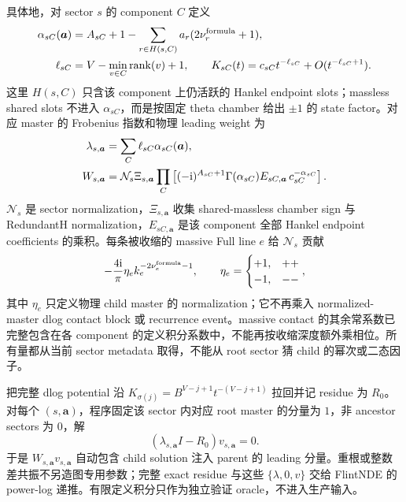\documentclass[11pt,a4paper]{ctexart}
\newcommand{\ii}{\mathrm i}
\newcommand{\cN}{\mathcal N}
\begin{document}
具体地，对 sector $s$ 的 component $C$ 定义
\begin{align}
 \alpha_{sC}(\bm a)&=A_{sC}+1-
 \sum_{r\in H(s,C)}a_r(2\nu_r^{\rm formula}+1),
 \notag\\
 \ell_{sC}&=V-\min_{v\in C}\operatorname{rank}(v)+1,
 \qquad
 K_{sC}(t)=c_{sC}t^{-\ell_{sC}}+O(t^{-\ell_{sC}+1}).
 \label{eq:generic-sector-boundary-component}
\end{align}
这里 $H(s,C)$ 只含该 component 上仍活跃的 Hankel endpoint slots；massless shared slots 不进入 $\alpha_{sC}$，而是按固定 theta chamber 给出 $\pm1$ 的 state factor。对应 master 的 Frobenius 指数和物理 leading weight 为
\begin{align}
 \lambda_{s,\bm a}&=\sum_C\ell_{sC}\alpha_{sC}(\bm a),
 \notag\\
 W_{s,\bm a}&=\cN_s\Xi_{s,\bm a}
 \prod_C\left[
 (-\ii)^{A_{sC}+1}\Gamma(\alpha_{sC})
 E_{sC,\bm a}\,c_{sC}^{-\alpha_{sC}}
 \right].
 \label{eq:generic-sector-boundary-weight}
\end{align}
$\cN_s$ 是 sector normalization，$\Xi_{s,\bm a}$ 收集 shared-massless chamber sign 与 RedundantH normalization，$E_{sC,\bm a}$ 是该 component 全部 Hankel endpoint coefficients 的乘积。每条被收缩的 massive Full line $e$ 给 $\cN_s$ 贡献
\begin{equation}
 -\frac{4\ii}{\pi}\eta_e k_e^{-2\nu_e^{\rm formula}-1},
 \qquad
 \eta_e=\begin{cases}+1,&++\\-1,&--\end{cases},
 \label{eq:massive-full-pinch-normalization}
\end{equation}
其中 $\eta_e$ 只定义物理 child master 的 normalization；它不再乘入 normalized-master dlog contact block 或 recurrence event。massive contact 的其余常系数已完整包含在各 component 的定义积分系数中，不能再按收缩深度额外乘相位。所有量都从当前 sector metadata 取得，不能从 root sector 猜 child 的幂次或二态因子。

把完整 dlog potential 沿 $K_{\sigma(j)}=B^{V-j+1}t^{-(V-j+1)}$ 拉回并记 residue 为 $R_0$。对每个 $(s,\bm a)$，程序固定该 sector 内对应 root master 的分量为 $1$，非 ancestor sectors 为 $0$，解
\begin{equation}
 (\lambda_{s,\bm a}I-R_0)v_{s,\bm a}=0.
 \label{eq:generic-sector-indicial-vector}
\end{equation}
于是 $W_{s,\bm a}v_{s,\bm a}$ 自动包含 child solution 注入 parent 的 leading 分量。重根或整数差共振不另造图专用参数；完整 exact residue 与这些 $\{\lambda,0,v\}$ 交给 FlintNDE 的 power-log 递推。有限定义积分只作为独立验证 oracle，不进入生产输入。
\end{document}
